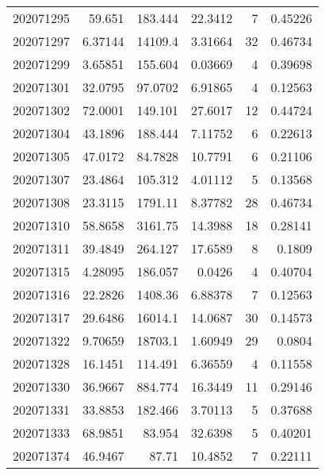 \begin{tabular}{rrrrrr}
 202071295 &         59.651   &      183.444  &           22.3412  &           7 & 0.45226 \\
 202071297 &          6.37144 &    14109.4    &            3.31664 &          32 & 0.46734 \\
 202071299 &          3.65851 &      155.604  &            0.03669 &           4 & 0.39698 \\
 202071301 &         32.0795  &       97.0702 &            6.91865 &           4 & 0.12563 \\
 202071302 &         72.0001  &      149.101  &           27.6017  &          12 & 0.44724 \\
 202071304 &         43.1896  &      188.444  &            7.11752 &           6 & 0.22613 \\
 202071305 &         47.0172  &       84.7828 &           10.7791  &           6 & 0.21106 \\
 202071307 &         23.4864  &      105.312  &            4.01112 &           5 & 0.13568 \\
 202071308 &         23.3115  &     1791.11   &            8.37782 &          28 & 0.46734 \\
 202071310 &         58.8658  &     3161.75   &           14.3988  &          18 & 0.28141 \\
 202071311 &         39.4849  &      264.127  &           17.6589  &           8 & 0.1809  \\
 202071315 &          4.28095 &      186.057  &            0.0426  &           4 & 0.40704 \\
 202071316 &         22.2826  &     1408.36   &            6.88378 &           7 & 0.12563 \\
 202071317 &         29.6486  &    16014.1    &           14.0687  &          30 & 0.14573 \\
 202071322 &          9.70659 &    18703.1    &            1.60949 &          29 & 0.0804  \\
 202071328 &         16.1451  &      114.491  &            6.36559 &           4 & 0.11558 \\
 202071330 &         36.9667  &      884.774  &           16.3449  &          11 & 0.29146 \\
 202071331 &         33.8853  &      182.466  &            3.70113 &           5 & 0.37688 \\
 202071333 &         68.9851  &       83.954  &           32.6398  &           5 & 0.40201 \\
 202071374 &         46.9467  &       87.71   &           10.4852  &           7 & 0.22111 \\

\end{tabular}
